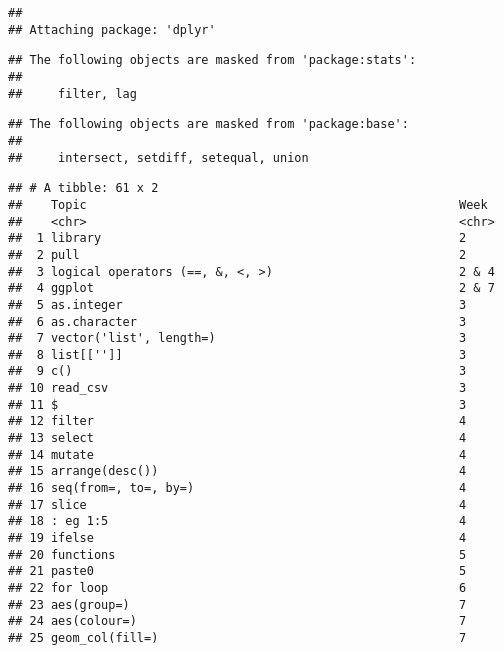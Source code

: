 \documentclass[
]{article}
\begin{document}
\begin{verbatim}
## 
## Attaching package: 'dplyr'
\end{verbatim}

\begin{verbatim}
## The following objects are masked from 'package:stats':
## 
##     filter, lag
\end{verbatim}

\begin{verbatim}
## The following objects are masked from 'package:base':
## 
##     intersect, setdiff, setequal, union
\end{verbatim}

\begin{verbatim}
## # A tibble: 61 x 2
##    Topic                                                    Week 
##    <chr>                                                    <chr>
##  1 library                                                  2    
##  2 pull                                                     2    
##  3 logical operators (==, &, <, >)                          2 & 4
##  4 ggplot                                                   2 & 7
##  5 as.integer                                               3    
##  6 as.character                                             3    
##  7 vector('list', length=)                                  3    
##  8 list[['']]                                               3    
##  9 c()                                                      3    
## 10 read_csv                                                 3    
## 11 $                                                        3    
## 12 filter                                                   4    
## 13 select                                                   4    
## 14 mutate                                                   4    
## 15 arrange(desc())                                          4    
## 16 seq(from=, to=, by=)                                     4    
## 17 slice                                                    4    
## 18 : eg 1:5                                                 4    
## 19 ifelse                                                   4    
## 20 functions                                                5    
## 21 paste0                                                   5    
## 22 for loop                                                 6    
## 23 aes(group=)                                              7    
## 24 aes(colour=)                                             7    
## 25 geom_col(fill=)                                          7    

\end{verbatim}
\end{document}

